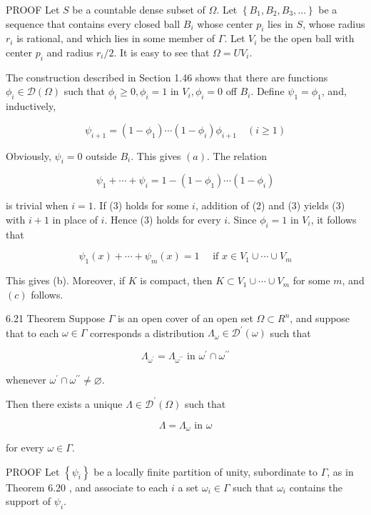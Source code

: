 \documentclass[10pt]{article}
\begin{document}
PROOF Let $S$ be a countable dense subset of $\Omega$. Let $\left\{B_{1}, B_{2}, B_{3}, \ldots\right\}$ be a sequence that contains every closed ball $B_{i}$ whose center $p_{i}$ lies in $S$, whose radius $r_{i}$ is rational, and which lies in some member of $\Gamma$. Let $V_{i}$ be the open ball with center $p_{i}$ and radius $r_{i} / 2$. It is easy to see that $\Omega=U V_{i}$.

The construction described in Section 1.46 shows that there are functions $\phi_{i} \in \mathscr{D}(\Omega)$ such that $\phi_{i} \geq 0, \phi_{i}=1$ in $V_{i}, \phi_{i}=0$ off $B_{i}$. Define $\psi_{1}=\phi_{1}$, and, inductively,

$$
\psi_{i+1}=\left(1-\phi_{1}\right) \cdots\left(1-\phi_{i}\right) \phi_{i+1} \quad(i \geq 1)
$$

Obviously, $\psi_{i}=0$ outside $B_{i}$. This gives $(a)$. The relation

$$
\psi_{1}+\cdots+\psi_{i}=1-\left(1-\phi_{1}\right) \cdots\left(1-\phi_{i}\right)
$$

is trivial when $i=1$. If (3) holds for some $i$, addition of (2) and (3) yields (3) with $i+1$ in place of $i$. Hence (3) holds for every $i$. Since $\phi_{i}=1$ in $V_{i}$, it follows that

$$
\psi_{1}(x)+\cdots+\psi_{m}(x)=1 \quad \text { if } x \in V_{1} \cup \cdots \cup V_{m}
$$

This gives (b). Moreover, if $K$ is compact, then $K \subset V_{1} \cup \cdots \cup V_{m}$ for some $m$, and $(c)$ follows.

6.21 Theorem Suppose $\Gamma$ is an open cover of an open set $\Omega \subset R^{n}$, and suppose that to each $\omega \in \Gamma$ corresponds a distribution $\Lambda_{\omega} \in \mathscr{D}^{\prime}(\omega)$ such that

$$
\Lambda_{\omega^{\prime}}=\Lambda_{\omega^{\prime \prime}} \text { in } \omega^{\prime} \cap \omega^{\prime \prime}
$$

whenever $\omega^{\prime} \cap \omega^{\prime \prime} \neq \varnothing$.

Then there exists a unique $\Lambda \in \mathscr{D}^{\prime}(\Omega)$ such that

$$
\Lambda=\Lambda_{\omega} \text { in } \omega
$$

for every $\omega \in \Gamma$.

PROOF Let $\left\{\psi_{i}\right\}$ be a locally finite partition of unity, subordinate to $\Gamma$, as in Theorem 6.20 , and associate to each $i$ a set $\omega_{i} \in \Gamma$ such that $\omega_{i}$ contains the support of $\psi_{i}$.
\end{document}
